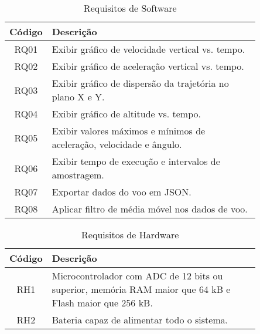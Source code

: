 \begin{table}[htpb]
\centering
\scriptsize %
\setlength{\tabcolsep}{4pt} %
\caption{Requisitos de Software} %
\begin{tabular}{|c|p{0.85\linewidth}|}
\hline
\textbf{Código} & \textbf{Descrição} \\
\hline
RQ01 & Exibir gráfico de velocidade vertical vs. tempo. \\
\hline
RQ02 & Exibir gráfico de aceleração vertical vs. tempo. \\
\hline
RQ03 & Exibir gráfico de dispersão da trajetória no plano X e Y. \\
\hline
RQ04 & Exibir gráfico de altitude vs. tempo. \\
\hline
RQ05 & Exibir valores máximos e mínimos de aceleração, velocidade e ângulo. \\
\hline
RQ06 & Exibir tempo de execução e intervalos de amostragem. \\
\hline
RQ07 & Exportar dados do voo em JSON. \\
\hline
RQ08 & Aplicar filtro de média móvel nos dados de voo. \\
\hline
\end{tabular}
\label{tab:requisitos_detalhados} %
\end{table}


\begin{table}[htpb]
\centering
\scriptsize
\setlength{\tabcolsep}{4pt}
\caption{Requisitos de Hardware}
\begin{tabular}{|c|p{0.85\linewidth}|}
\hline
\textbf{Código} & \textbf{Descrição} \\
\hline
RH1 & Microcontrolador com ADC de 12 bits ou superior, memória RAM maior que 64 kB e Flash maior que 256 kB. \\
\hline
RH2 & Bateria capaz de alimentar todo o sistema. \\
\hline
\end{tabular}
\label{tab:requisitos-hardware}
\end{table}

